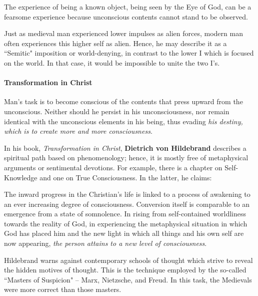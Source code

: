 \begin{quotex}
The experience of being a known object, being seen by the Eye of God, can be a fearsome experience because unconscious contents cannot stand to be observed. 

\end{quotex}
Just as medieval man experienced lower impulses as alien forces, modern man often experiences this higher self as alien. Hence, he may describe it as a ``Semitic" imposition or world-denying, in contrast to the lower I which is focused on the world. In that case, it would be impossible to unite the two I's.

\paragraph{Transformation in Christ}
\begin{quotex}
Man's task is to become conscious of the contents that press upward from the unconscious. Neither should he persist in his unconsciousness, nor remain identical with the unconscious elements in his being, thus evading \emph{his destiny, which is to create more and more consciousness}. 

\end{quotex}
In his book, \emph{Transformation in Christ}, \textbf{Dietrich von Hildebrand} describes a spiritual path based on phenomenology; hence, it is mostly free of metaphysical arguments or sentimental devotions. For example, there is a chapter on Self-Knowledge and one on True Consciousness. In the latter, he claims:

\begin{quotex}
The inward progress in the Christian's life is linked to a process of awakening to an ever increasing degree of consciousness. Conversion itself is comparable to an emergence from a state of somnolence. In rising from self-contained worldliness towards the reality of God, in experiencing the metaphysical situation in which God has placed him and the new light in which all things and his own self are now appearing, \emph{the person attains to a new level of consciousness}.

\end{quotex}
Hildebrand warns against contemporary schools of thought which strive to reveal the hidden motives of thought. This is the technique employed by the so-called ``Masters of Suspicion" – Marx, Nietzsche, and Freud. In this task, the Medievals were more correct than those masters.

